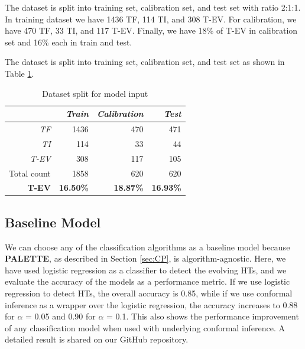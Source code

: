 The dataset is split into training set, calibration set, and test set with ratio 2:1:1. In training dataset we have 1436 TF, 114 TI, and 308 T-EV. For calibration, we have 470 TF, 33 TI, and 117 T-EV. Finally, we have 18\% of T-EV in calibration set and 16\% each in train and test. 



The dataset is split into training set, calibration set, and test set as shown in Table \ref{tab:dataset}. 


\begin{table}[ht]
\centering
\caption{Dataset split for model input}
\begin{tabular}{rrrr}
\hline
\multicolumn{1}{l}{\textit{\textbf{}}} & \textit{Train}   & \textit{Calibration} & \textit{Test}    \\ \hline
\textit{TF}                            & 1436             & 470                  & 471              \\ \hline
\textit{TI}                            & 114              & 33                   & 44               \\ \hline
\textit{T-EV}                          & 308              & 117                  & 105              \\ \hline
Total count                            & 1858    & 620      & 620     \\
\textbf{T-EV}                                   & \textbf{16.50\%} & \textbf{18.87\%}     & \textbf{16.93\%}
\end{tabular}
\label{tab:dataset}
\end{table}



\subsection*{Baseline Model}
\label{Sec:Base}
We can choose any of the classification algorithms as a baseline model because \textbf{PALETTE}, as described in Section \ref{sec:CP}, is algorithm-agnostic. Here, we have used logistic regression as a classifier to detect the evolving HTs, and we evaluate the accuracy of the models as a performance metric. If we use logistic regression to detect HTs, the overall accuracy is 0.85, while if we use conformal inference as a wrapper over the logistic regression, the accuracy increases to 0.88 for $\alpha$ = 0.05 and 0.90 for $\alpha$ = 0.1. This also shows the performance improvement of any classification model when used with underlying conformal inference. A detailed result is shared on our GitHub repository.



